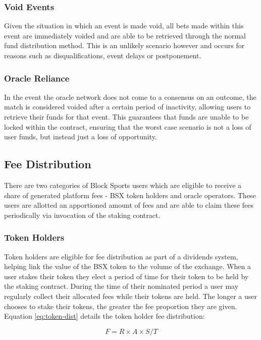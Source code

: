 \documentclass{article}
\begin{document}
		\subsubsection{Void Events}
Given the situation in which an event is made void, all bets made within this event are immediately voided and are able to be retrieved through the normal fund distribution method. This is an unlikely scenario however and occurs for reasons such as disqualifications, event delays or postponement.

		\subsubsection{Oracle Reliance}
In the event the oracle network does not come to a consensus on an outcome, the match is considered voided after a certain period of inactivity, allowing users to retrieve their funds for that event. This guarantees that funds are unable to be locked within the contract, ensuring that the worst case scenario is not a loss of user funds, but instead just a loss of opportunity.


	\subsection{Fee Distribution}
There are two categories of Block Sports users which are eligible to receive a share of generated platform fees - BSX token holders and oracle operators. These users are allotted an apportioned amount of fees and are able to claim these fees periodically via invocation of the staking contract.

		\subsubsection{Token Holders}
Token holders are eligible for fee distribution as part of a dividends system, helping link the value of the BSX token to the volume of the exchange. When a user stakes their token they elect a period of time for their token to be held by the staking contract. During the time of their nominated period a user may regularly collect their allocated fees while their tokens are held. The longer a user chooses to stake their tokens, the greater the fee proportion they are given. Equation \ref{eq:token-dist} details the token holder fee distribution:

\begin{equation}
F = R\times A\times S/T\label{eq:token-dist}
\end{equation}
\end{document}
